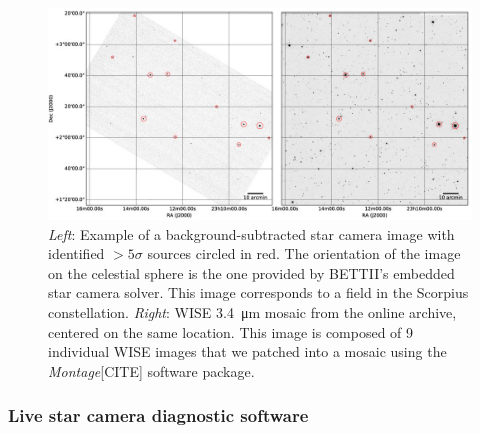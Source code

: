 \begin{landscape}
\begin{figure}[!ht]
	\centering
	\includegraphics[width=1.5\textwidth]{Figures/starcam_images.jpg}
	\caption[Star camera example WISE]{\textit{Left}: Example of a background-subtracted star camera image with identified $>5\sigma$ sources circled in red. The orientation of the image on the celestial sphere is the one provided by BETTII's embedded star camera solver. This image corresponds to a field in the Scorpius constellation. \textit{Right}: WISE \SI{3.4}{\um} mosaic from the online archive, centered on the same location. This image is composed of 9 individual WISE images that we patched into a mosaic using the \textit{Montage}[CITE] software package.}
	\label{fig:starcamexample}
    \end{figure}
\end{landscape}

\subsubsection{Live star camera diagnostic software}

